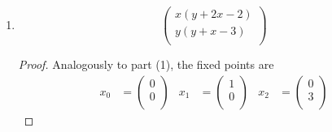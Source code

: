 \documentclass[../psets.tex]{subfiles}
\begin{document}
\begin{enumerate}
\begin{enumerate}
\begin{proof}
\begin{align*}
\begin{pmatrix}
                    0 & -2\\
                \end{pmatrix}&
                A_2 &=
                \begin{pmatrix}
                    1 & 0\\
                    0 & -2\\
                \end{pmatrix}
            \end{align*}
            Since these are all diagonal matrices, the eigenvalues can be read off the diagonal without further manipulation. Since all eigenvalues of $A_1,A_2$ are negative,
            \begin{equation*}
                \boxed{x_0,x_1\text{ are asymptotically stable.}}
            \end{equation*}
            Since one eigenvalue of $A_2$ is positive,
            \begin{equation*}
                \boxed{x_2\text{ is not even Lyapunov stable.}}
            \end{equation*}
        \end{proof}
        \item 
        \begin{equation*}
            \begin{pmatrix}
                x(y+2x-2)\\
                y(y+x-3)\\
            \end{pmatrix}
        \end{equation*}
        \begin{proof}
            Analogously to part (1), the fixed points are
            \begin{align*}
                x_0 &=
                \begin{pmatrix}
                    0\\
                    0\\
                \end{pmatrix}&
                x_1 &=
                \begin{pmatrix}
                    1\\
                    0\\
                \end{pmatrix}&
                x_2 &=
                \begin{pmatrix}
                    0\\
                    3\\

\end{pmatrix}
\end{align*}
\end{proof}
\end{enumerate}
\end{enumerate}
\end{document}
